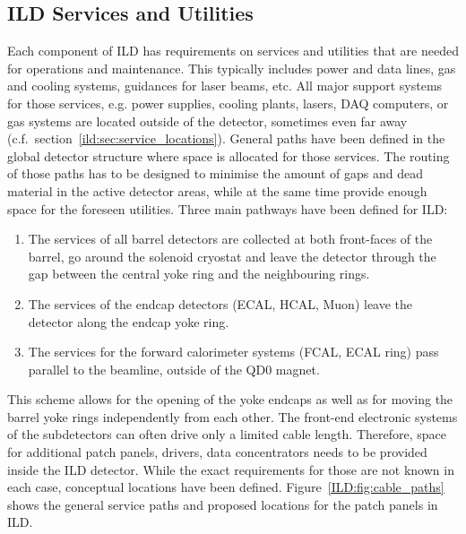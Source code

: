 \subsection{ILD Services and Utilities}
\label{ild:sec:services}
Each component of ILD has requirements on services and utilities that are needed for operations and maintenance. This typically includes power and data lines, gas and cooling systems, guidances for laser beams, etc. All major support systems for those services, e.g. power supplies, cooling plants, lasers, DAQ computers, or gas systems are located outside of the detector, sometimes even far away (c.f.~section~\ref{ild:sec:service_locations}). General paths have been defined in the global detector structure where space is allocated for those services. The routing of those paths has to be designed to minimise the amount of gaps and dead material in the active detector areas, while at the same time provide enough space for the foreseen utilities. Three main pathways have been defined for ILD:
\begin{enumerate}
    \item The services of all barrel detectors are collected at both front-faces of the barrel, go around the solenoid cryostat and leave the detector through the gap between the central yoke ring and the neighbouring rings.
    \item The services of the endcap detectors (ECAL, HCAL, Muon) leave the detector along the endcap yoke ring.
    \item The services for the forward calorimeter systems (FCAL, ECAL ring) pass parallel to the beamline, outside of the QD0 magnet.
\end{enumerate}

This scheme allows for the opening of the yoke endcaps as well as for moving the barrel yoke rings independently from each other. The front-end electronic systems of the subdetectors can often drive only a limited cable length. Therefore, space for additional patch panels, drivers, data concentrators needs to be provided inside the ILD detector. While the exact requirements for those are not known in each case, conceptual locations have been defined. Figure~\ref{ILD:fig:cable_paths} shows the general service paths and proposed locations for the patch panels in ILD.

